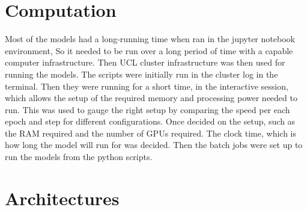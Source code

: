
\section{Computation}
Most of the models had a long-running time when ran in the jupyter notebook environment, So it needed to be run over a long period of time with a capable computer infrastructure.  Then UCL cluster infrastructure was then used for running the models. The scripts were initially run in the cluster log in the terminal. Then they were running for a short time, in the interactive session, which allows the setup of the required memory and processing power needed to run. This was used to gauge the right setup by comparing the speed per each epoch and step for different configurations.  Once decided on the setup, such as the RAM required and the number of GPUs required. The clock time, which is how long the model will run for was decided. Then the batch jobs were set up to run the models from the python scripts.


\section{Architectures}

